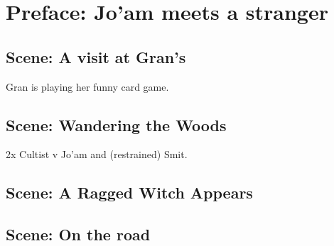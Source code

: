 \section{Preface: Jo'am meets a stranger}\label{sec:prefaceA:Jo'amMeetsAStranger}

\subsection{Scene: A visit at Gran's}\label{subsec:scene:AVisitAtGran's}


Gran is playing her funny card game.

\subsection{Scene: Wandering the Woods}\label{subsec:scene:WanderingTheWoods}
2x Cultist v Jo'am and (restrained) Smit.

\subsection{Scene: A Ragged Witch Appears}\label{subsec:scene:ARaggedWitchAppears}
\subsection{Scene: On the road}\label{subsec:scene:OnTheRoad}

